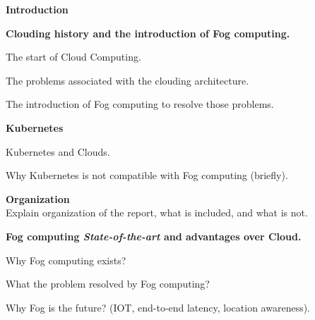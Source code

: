 \documentclass{report}
\begin{document}
	\begin{outline}
		\item {\bf Introduction }
  		\begin{outline}
			\item {\bf Clouding history and the introduction of Fog computing.} 
    		\begin{outline}
    			\item The start of Cloud Computing.
    			\item The problems associated with the clouding architecture. 
    			\item The introduction of Fog computing to resolve those problems. 
    		\end{outline}
    		\item {\bf Kubernetes}
    		\begin{outline}
				\item Kubernetes and Clouds.
				\item Why Kubernetes is not compatible with Fog computing (briefly).      	
    	
    		\end{outline}
    	\item {\bf Organization } \\
      		Explain organization of the report, what is included, and what is not.
     \end{outline}
    		
    		    	
   
  \item {\bf Fog computing {\em State-of-the-art} and advantages over Cloud. }
  \begin{outline}
  	\item Why Fog computing exists? 
  	\item What the problem resolved by Fog computing?  
  	\item Why Fog is the future? (IOT, end-to-end latency, location awareness).
  \end{outline}
  


	

\end{outline}
\end{document}
